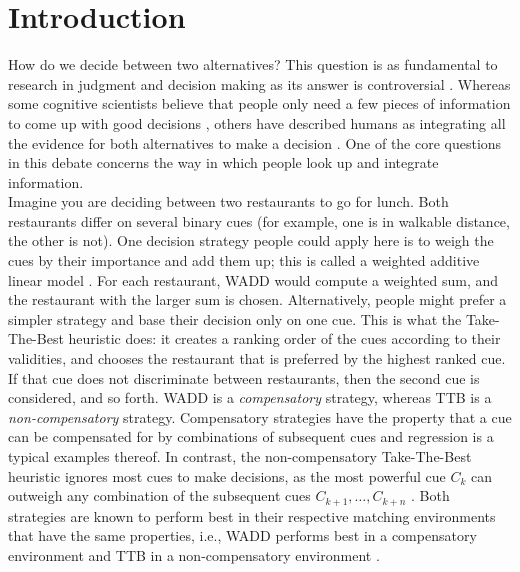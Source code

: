 \documentclass[10pt,letterpaper]{article}
\begin{document}
\section{Introduction}
How do we decide between two alternatives? This question is as fundamental to research in judgment and decision making as its answer is controversial \citep{todd2000precis}. Whereas some cognitive scientists believe that people only need a few pieces of information to come up with good decisions \citep{marewski2010good}, others have described humans as integrating all the evidence for both alternatives to make a decision \citep{arkes1986factors} . One of the core questions in this debate concerns the way in which people look up and integrate information.\\
Imagine you are deciding between two restaurants to go for lunch. Both restaurants differ on several binary cues (for example, one is in walkable distance, the other is not). One decision strategy people could apply here is to weigh the cues by their importance and add them up; this is called a weighted additive linear model \citep[WADD]{payne1993adaptive}. For each restaurant, WADD would compute a weighted sum, and the restaurant with the larger sum is chosen. Alternatively, people might prefer a simpler strategy and base their decision only on one cue. This is what the Take-The-Best heuristic \citep[TTB]{gigerenzer1996reasoning} does: it creates a ranking order of the cues according to their validities, and chooses the restaurant that is preferred by the highest ranked cue. If that cue does not discriminate between restaurants, then the second cue is considered, and so forth. WADD is a \textit{compensatory} strategy, whereas TTB is a \textit{non-compensatory} strategy. Compensatory strategies have the property that a cue can be compensated for by combinations of subsequent cues and regression is a typical examples thereof. In contrast, the non-compensatory Take-The-Best heuristic ignores most cues to make decisions, as the most powerful cue $C_k$ can outweigh any combination of the subsequent cues $C_{k+1},\dots,C_{k+n}$ \citep{gigerenzer1999betting}. Both strategies are known to perform best in their respective matching environments that have the same properties, i.e., WADD performs best in a compensatory environment and TTB in a non-compensatory environment \citep{martignon1999does}. 
\end{document}
